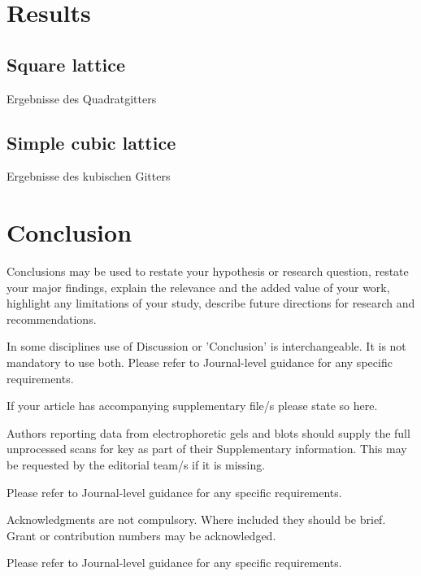 \documentclass[iicol,sn-mathphys,Numbered]{sn-jnl}%
\theoremstyle{thmstyleone}%
\theoremstyle{thmstyletwo}%
\theoremstyle{thmstylethree}%
\begin{document}
\section{Results}\label{sec:results}

\subsection{Square lattice}\label{ssec:square}

Ergebnisse des Quadratgitters

\subsection{Simple cubic lattice}\label{ssec:simple_cubic}

Ergebnisse des kubischen Gitters

\section{Conclusion}\label{sec:conclusion}

Conclusions may be used to restate your hypothesis or research question, restate your major findings, explain the relevance and the added value of your work, highlight any limitations of your study, describe future directions for research and recommendations. 

In some disciplines use of Discussion or 'Conclusion' is interchangeable. It is not mandatory to use both. Please refer to Journal-level guidance for any specific requirements. 

\backmatter


If your article has accompanying supplementary file/s please state so here. 

Authors reporting data from electrophoretic gels and blots should supply the full unprocessed scans for key as part of their Supplementary information. This may be requested by the editorial team/s if it is missing.

Please refer to Journal-level guidance for any specific requirements.


Acknowledgments are not compulsory. Where included they should be brief. Grant or contribution numbers may be acknowledged.

Please refer to Journal-level guidance for any specific requirements.
\end{document}
